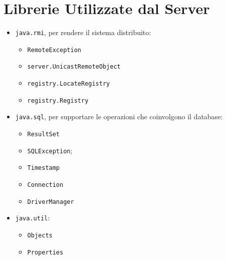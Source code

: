 \section{Librerie Utilizzate dal Server}
\begin{itemize}
	\item \texttt{java.rmi}, per rendere il sistema distribuito:
		\begin{itemize}
			\item \texttt{RemoteException}
			\item \texttt{server.UnicastRemoteObject}
			\item \texttt{registry.LocateRegistry}
			\item \texttt{registry.Registry}
		\end{itemize}
	\item \texttt{java.sql}, per supportare le operazioni che coinvolgono il database:
		\begin{itemize}
			\item \texttt{ResultSet}
			\item \texttt{SQLException};
			\item \texttt{Timestamp}
			\item \texttt{Connection}
			\item \texttt{DriverManager}
		\end{itemize}
	\item \texttt{java.util}:
	\begin{itemize}
		\item \texttt{Objects}
		\item \texttt{Properties}
	\end{itemize}
	
\end{itemize}

